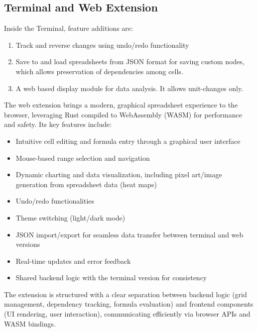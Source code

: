 \documentclass{article}
\begin{document}
\subsection*{Terminal and Web Extension}

Inside the Terminal, feature additions are:
\begin{enumerate}
    \item Track and reverse changes using undo/redo functionality
    \item Save to and load spreadsheets from JSON format for saving custom nodes, which allows preservation of dependencies among cells.
    \item A web based display module for data analysis. It allows unit-changes only.
\end{enumerate}

The web extension brings a modern, graphical spreadsheet experience to the browser, leveraging Rust compiled to WebAssembly (WASM) for performance and safety. Its key features include:
\begin{itemize}
\item Intuitive cell editing and formula entry through a graphical user interface
\item Mouse-based range selection and navigation
\item Dynamic charting and data visualization, including pixel art/image generation from spreadsheet data (heat maps)
\item Undo/redo functionalities
\item Theme switching (light/dark mode)
\item JSON import/export for seamless data transfer between terminal and web versions
\item Real-time updates and error feedback
\item Shared backend logic with the terminal version for consistency
\end{itemize}
The extension is structured with a clear separation between backend logic (grid management, dependency tracking, formula evaluation) and frontend components (UI rendering, user interaction), communicating efficiently via browser APIs and WASM bindings.
\end{document}
